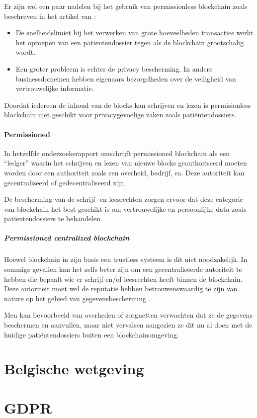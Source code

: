 Er zijn wel een paar nadelen bij het gebruik van permissionless blockchain zoals beschreven in het artikel van \textcite{Liu}:
\begin{itemize}
    \item De snelheidslimiet bij het verwerken van grote hoeveelheden transacties werkt het oproepen van een patiëntendossier tegen als de blockchain grootschalig wordt.
    \item Een groter probleem is echter de privacy bescherming. In andere businessdomeinen hebben eigenaars bezorgdheden over de veiligheid van vertrouwelijke informatie.
\end{itemize}


Doordat iedereen de inhoud van de blocks kan schrijven en lezen is permisionless blockchain niet geschikt voor privacygevoelige zaken zoals patiëntendossiers.


\paragraph{Permissioned}

In hetzelfde onderzoeksrapport omschrijft \textcite{Yaga2018} permissioned blockchain als een ``ledger'' waarin het schrijven en lezen van nieuwe blocks geauthoriseerd moeten worden door een authoriteit zoals een overheid, bedrijf, ea. Deze autoriteit kan gecentraliseerd of gedecentraliseerd zijn.

De bescherming van de schrijf -en leesrechten zorgen ervoor dat deze categorie van blockchain het best geschikt is om vertrouwelijke en persoonlijke data zoals patiëntendossiers te behandelen.

\subparagraph{Permissioned centralized blockchain}


Hoewel blockchain in zijn basis een trustless systeem is dit niet noodzakelijk. In sommige gevallen kan het zelfs beter zijn om een gecentraliseerde autoriteit te hebben die bepaalt wie er schrijf en/of leesrechten heeft binnen de blockchain. Deze autoriteit moet wel de reputatie hebben betrouwenswaardig te zijn van nature op het gebied van gegevensbescherming \autocite{Bacon2018}. 

Men kan bevoorbeeld van overheden of zorgnetten verwachten dat ze de gegevens beschermen en aanvullen, maar niet vervalsen aangezien ze dit nu al doen met de huidige patiëntendossiers buiten een blockchainomgeving.


\section{Belgische wetgeving}


\section{GDPR}